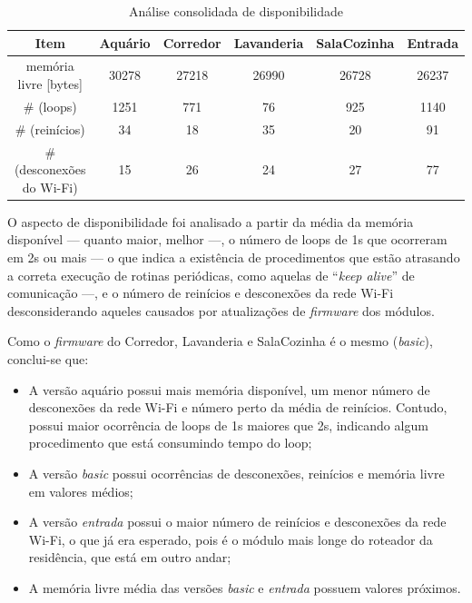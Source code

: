\begin{table}[H]
    \caption{Análise consolidada de disponibilidade}
    \setlength\tabcolsep{1.5pt}
    \centering
    \footnotesize
	\begin{tabular}{cccccc}
		\toprule
        \textbf{Item} & \textbf{Aquário} & \textbf{Corredor} & \textbf{Lavanderia} & \textbf{SalaCozinha} & \textbf{Entrada} \\
        \midrule
        memória livre [bytes] &
        30278 &
        27218 &
        26990 &
        26728 &
        26237 \\
        \# (loops) &
        1251 &
        771 &
        76 &
        925 &
        1140 \\
        \# (reinícios) &
        34 &
        18 &
        35 &
        20 &
        91 \\
        \# (desconexões do Wi-Fi) &
        15 &
        26 &
        24 &
        27 &
		77 \\
		\bottomrule
    \end{tabular}
\end{table}

O aspecto de disponibilidade foi analisado a partir da média da memória disponível --- quanto maior, melhor ---, o número de loops de 1s que ocorreram em 2s ou mais --- o que indica a existência de procedimentos que estão atrasando a correta execução de rotinas periódicas, como aquelas de “\emph{keep alive}” de comunicação ---, e o número de reinícios e desconexões da rede Wi-Fi desconsiderando aqueles causados por atualizações de \emph{firmware} dos módulos.

Como o \emph{firmware} do Corredor, Lavanderia e SalaCozinha é o mesmo (\emph{basic}), conclui-se que:

\begin{itemize}
	\item A versão aquário possui mais memória disponível, um menor número de desconexões da rede Wi-Fi e número perto da média de reinícios. Contudo, possui maior ocorrência de loops de 1s maiores que 2s, indicando algum procedimento que está consumindo tempo do loop;
	\item A versão \emph{basic} possui ocorrências de desconexões, reinícios e memória livre em valores médios;
	\item A versão \emph{entrada} possui o maior número de reinícios e desconexões da rede Wi-Fi, o que já era esperado, pois é o módulo mais longe do roteador da residência, que está em outro andar;
	\item A memória livre média das versões \emph{basic} e \emph{entrada} possuem valores próximos.
\end{itemize}

